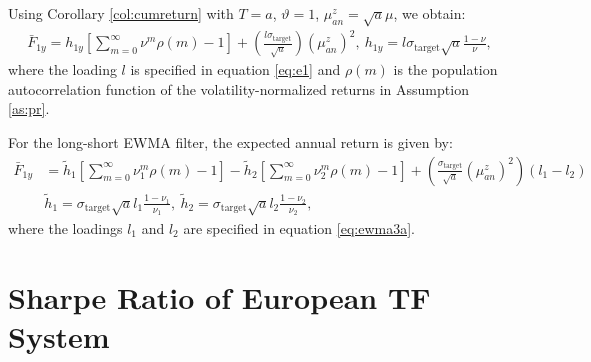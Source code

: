 \documentclass[hidelinks]{siamonline250211}
\begin{document}
\begin{corollary} Using Corollary \ref{col:cumreturn} with $T=a$, $\vartheta=1$, $\mu^{z}_{an}=\sqrt{a} \mu$, we obtain:
	\begin{equation} \label{eq:er2} 
		\begin{split}
			\bar{F}_{1y} = h_{1y} \left[ \sum^{\infty}_{m=0} \nu^{m}\rho(m) -  1 \right]  +  \left( \frac{l\sigma_{\mathrm{target}} }{\sqrt{a}} \right)  (\mu^{z}_{an})^{2}  , \ h_{1y} = l\sigma_{\mathrm{target}}\sqrt{a}\frac{1-\nu }{\nu},
		\end{split}
	\end{equation}
	where the loading $l$ is specified in equation \eqref{eq:e1} and $\rho(m)$ is the population autocorrelation function of the volatility-normalized returns in Assumption \ref{as:pr}.
	
	
	
	For the long-short EWMA filter, the expected annual return is given by:
	\begin{equation} \label{eq:er3} 
		\begin{split}
			\bar{F}_{1y}  &   =\widetilde{h}_{1} \left[ \sum^{\infty}_{m=0} \nu^{m}_{1}\rho(m) -  1 \right]  -  \widetilde{h}_{2}  \left[ \sum^{\infty}_{m=0} \nu^{m}_{2}\rho(m) -  1 \right] + \left( \frac{\sigma_{\mathrm{target}} }{\sqrt{a}}  (\mu^{z}_{an})^{2} \right)    \left(l_{1}-l_{2}\right)\\
			& \widetilde{h}_{1} = \sigma_{\mathrm{target}} \sqrt{a}  l_{1}\frac{1-\nu_{1} }{\nu_{1}}, \ \widetilde{h}_{2} =  \sigma_{\mathrm{target}} \sqrt{a} l_{2}\frac{1-\nu_{2} }{\nu_{2}}, 
		\end{split}
	\end{equation}
	where the loadings $l_{1}$ and $l_{2}$ are specified in equation \eqref{eq:ewma3a}.
	
\end{corollary}




\section{Sharpe Ratio of European TF System}\label{sec:sr}
\end{document}
